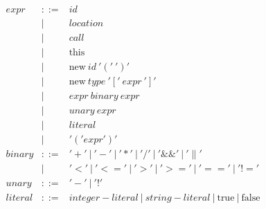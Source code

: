 \documentclass{article}
\begin{document}
$$\begin{array}{rcl}
 expr & ::= & id \\
 & | & location\\
 & | & call\\
 & | & \textrm{this} \\
 & | & \textrm{new} ~id ~'('~')' \\
 & | & \textrm{new} ~type ~'['~expr~']' \\
 & | & expr ~binary ~expr\\
 & | & unary ~expr\\
 & | & literal\\
 & | & '('expr')'\\
 binary & ::= & '+' ~|~ '-' ~|~ '*' ~|~ '/' ~|~ '\&\&' ~|~ '\|' \\
 & | &  '<' ~|~ '<=' ~|~ '>' ~|~ '>=' ~|~ '==' ~|~ '!=' \\
 unary & ::= & '-' ~|~ '!' \\
 literal & ::= & integer-literal ~|~ string-literal ~|~ \textrm{true} ~|~ \textrm{false} \\
\end{array}
$$



{\footnotesize 

}

\end{document}
